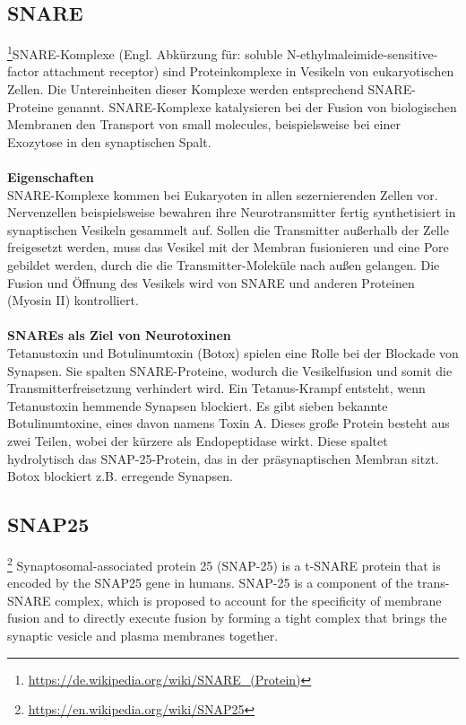 \subsection{SNARE}\footnote{\url{https://de.wikipedia.org/wiki/SNARE_(Protein)}}SNARE-Komplexe (Engl. Abkürzung für: soluble N-ethylmaleimide-sensitive-factor attachment receptor) sind Proteinkomplexe in Vesikeln von eukaryotischen Zellen. Die Untereinheiten dieser Komplexe werden entsprechend SNARE-Proteine genannt. SNARE-Komplexe katalysieren bei der Fusion von biologischen Membranen den Transport von small molecules, beispielsweise bei einer Exozytose in den synaptischen Spalt.
\\\\
\textbf{Eigenschaften}\\
SNARE-Komplexe kommen bei Eukaryoten in allen sezernierenden Zellen vor. Nervenzellen beispielsweise bewahren ihre Neurotransmitter fertig synthetisiert in synaptischen Vesikeln gesammelt auf. Sollen die Transmitter außerhalb der Zelle freigesetzt werden, muss das Vesikel mit der Membran fusionieren und eine Pore gebildet werden, durch die die Transmitter-Moleküle nach außen gelangen. Die Fusion und Öffnung des Vesikels wird von SNARE und anderen Proteinen (Myosin II) kontrolliert.
\\\\
\textbf{SNAREs als Ziel von Neurotoxinen}\\
Tetanustoxin und Botulinumtoxin (Botox) spielen eine Rolle bei der Blockade von Synapsen. Sie spalten SNARE-Proteine, wodurch die Vesikelfusion und somit die Transmitterfreisetzung verhindert wird. Ein Tetanus-Krampf entsteht, wenn Tetanustoxin hemmende Synapsen blockiert. Es gibt sieben bekannte Botulinumtoxine, eines davon namens Toxin A. Dieses große Protein besteht aus zwei Teilen, wobei der kürzere als Endopeptidase wirkt. Diese spaltet hydrolytisch das SNAP-25-Protein, das in der präsynaptischen Membran sitzt. Botox blockiert z.B. erregende Synapsen.

\subsection{SNAP25}\footnote{\url{https://en.wikipedia.org/wiki/SNAP25}}
Synaptosomal-associated protein 25 (SNAP-25) is a t-SNARE protein that is encoded by the SNAP25 gene in humans. SNAP-25 is a component of the trans-SNARE complex, which is proposed to account for the specificity of membrane fusion and to directly execute fusion by forming a tight complex that brings the synaptic vesicle and plasma membranes together.

